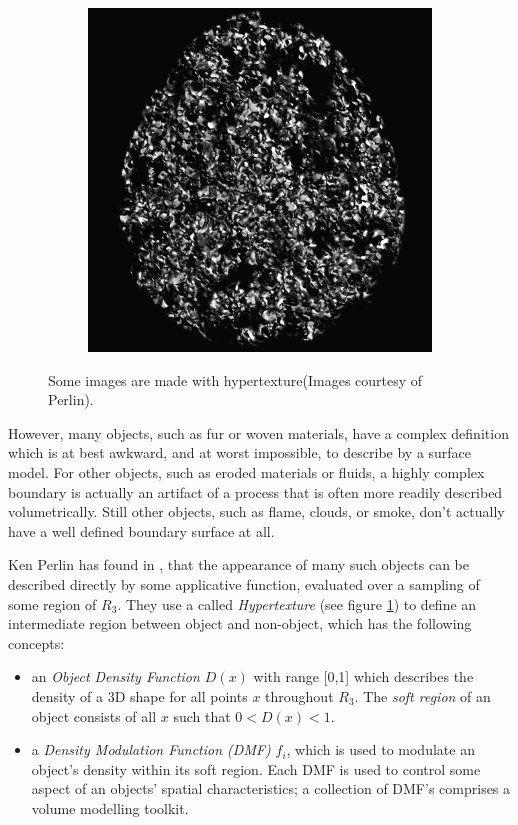 \begin{figure}
\begin{subfigure}[b]{.32\textwidth}
	\end{subfigure}
	\begin{subfigure}[b]{.32\textwidth}
		\includegraphics[width=1.0\textwidth]{graphics/df/hypertexture3}
	\end{subfigure}
	\caption{Some images are made with hypertexture(Images courtesy of Perlin).}
	\label{f:hypertexture}
\end{figure}

However, many objects, such as fur or woven materials, have a complex definition which is at best awkward, and at worst impossible, to describe by a surface model. For other objects, such as eroded materials or fluids, a highly complex boundary is actually an artifact of a process that is often more readily described volumetrically. Still other objects, such as flame, clouds, or smoke, don't actually have a well defined boundary surface at all.

Ken Perlin has found in \cite[5mm]{a:hypetrtexture}, that the appearance of many such objects can be described directly by some applicative function, evaluated over a sampling of some region of $R_{3}$. They use a called \textit{Hypertexture} (see figure \ref{f:hypertexture}) to define an intermediate region between object and non-object, which has the following concepts:

\begin{itemize}
	\item an \textit{Object Density Function $D(x)$} with range [0,1] which describes the density of a 3D shape for all points $x$ throughout $R_{3}$. The \textit{soft region} of an object consists of all $x$ such that $0<D(x)<1$. 
	\item a \textit{Density Modulation Function (DMF)} $f_{i}$, which is used to modulate an object's density within its soft region. Each DMF is used to control some aspect of an objects' spatial characteristics; a collection of DMF's comprises a volume modelling toolkit.   
\end{itemize}

